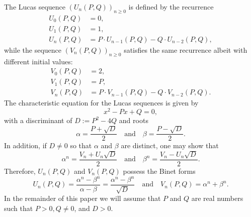 \documentclass[10pt]{article}
\theoremstyle{definition}
\begin{document}
The Lucas sequence $(U_n(P,Q))_{n\geq 0}$ is defined by the recurrence
\begin{align*}
    U_0(P,Q) &= 0, \\
    U_1(P,Q) &= 1, \\
    U_{n}(P,Q) &= P\cdot U_{n-1}(P,Q) - Q\cdot U_{n-2}(P,Q),
\end{align*}
while the sequence $(V_n(P,Q))_{n\geq 0}$ satisfies the same recurrence albeit with different initial values:
\begin{align*}
    V_0(P,Q) &= 2, \\
    V_1(P,Q) &= P, \\
    V_{n}(P,Q) &= P\cdot V_{n-1}(P,Q) - Q\cdot V_{n-2}(P,Q).
\end{align*}
The characteristic equation for the Lucas sequences is given by
\begin{equation*}
    x^2-Px+Q = 0,
\end{equation*}
with a discriminant of $D := P^2-4Q$ and roots
\begin{equation*}
    \alpha = \frac{P+\sqrt{D}}{2} \quad \text{and} \quad \beta = \frac{P- \sqrt{D}}{2}.
\end{equation*}
In addition, if $D \neq 0$ so that $\alpha$ and $\beta$ are distinct, one may show that
\begin{equation*}
    \alpha^n = \frac{V_n+U_n\sqrt{D}}{2} \quad \text{and} \quad \beta^n = \frac{V_n - U_n\sqrt{D}}{2}.
\end{equation*}
Therefore, $U_n(P,Q)$ and $V_n(P,Q)$ possess the Binet forms
\begin{equation*}
    U_n(P,Q) = \frac{\alpha^n - \beta^n}{\alpha - \beta} = \frac{\alpha^n - \beta^n}{\sqrt{D}} \quad \text{and} \quad V_n(P,Q) = \alpha^n + \beta^n.
\end{equation*}
In the remainder of this paper we will assume that $P$ and $Q$ are real numbers such that $P > 0, Q \neq 0$, and $D > 0$.
\end{document}

